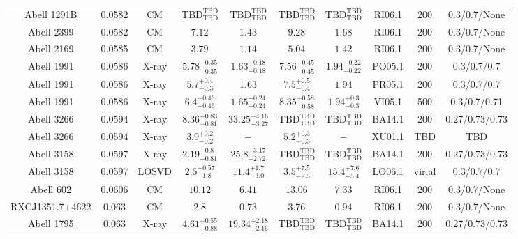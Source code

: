 \begin{table}
\begin{tabular}{cccccccccc}
Abell 1291B & 0.0582 & CM & ${\mathrm{TBD}}^{\mathrm{TBD}}_{\mathrm{TBD}}$ & ${\mathrm{TBD}}^{\mathrm{TBD}}_{\mathrm{TBD}}$ & ${\mathrm{TBD}}^{\mathrm{TBD}}_{\mathrm{TBD}}$ & ${\mathrm{TBD}}^{\mathrm{TBD}}_{\mathrm{TBD}}$ & RI06.1 & 200 & 0.3/0.7/None \\
Abell 2399 & 0.0582 & CM & ${7.12}^{}_{}$ & ${1.43}^{}_{}$ & ${9.28}^{}_{}$ & ${1.68}^{}_{}$ & RI06.1 & 200 & 0.3/0.7/None \\
Abell 2169 & 0.0585 & CM & ${3.79}^{}_{}$ & ${1.14}^{}_{}$ & ${5.04}^{}_{}$ & ${1.42}^{}_{}$ & RI06.1 & 200 & 0.3/0.7/None \\
Abell 1991 & 0.0586 & X-ray & ${5.78}^{+0.35}_{-0.35}$ & ${1.63}^{+0.18}_{-0.18}$ & ${7.56}^{+0.45}_{-0.45}$ & ${1.94}^{+0.22}_{-0.22}$ & PO05.1 & 200 & 0.3/0.7/0.7 \\
Abell 1991 & 0.0586 & X-ray & ${5.7}^{+0.4}_{-0.3}$ & ${1.63}^{}_{}$ & ${7.5}^{+0.5}_{-0.4}$ & ${1.94}^{}_{}$ & PR05.1 & 200 & 0.3/0.7/0.7 \\
Abell 1991 & 0.0586 & X-ray & ${6.4}^{+0.46}_{-0.46}$ & ${1.65}^{+0.24}_{-0.24}$ & ${8.35}^{+0.58}_{-0.58}$ & ${1.94}^{+0.3}_{-0.3}$ & VI05.1 & 500 & 0.3/0.7/0.71 \\
Abell 3266 & 0.0594 & X-ray & ${8.36}^{+0.83}_{-0.81}$ & ${33.25}^{+4.16}_{-3.27}$ & ${\mathrm{TBD}}^{\mathrm{TBD}}_{\mathrm{TBD}}$ & ${\mathrm{TBD}}^{\mathrm{TBD}}_{\mathrm{TBD}}$ & BA14.1 & 200 & 0.27/0.73/0.73 \\
Abell 3266 & 0.0594 & X-ray & ${3.9}^{+0.2}_{-0.2}$ & ${-}^{}_{}$ & ${5.2}^{+0.3}_{-0.3}$ & ${-}^{}_{}$ & XU01.1 & TBD & TBD \\
Abell 3158 & 0.0597 & X-ray & ${2.19}^{+0.8}_{-0.81}$ & ${25.8}^{+3.17}_{-2.72}$ & ${\mathrm{TBD}}^{\mathrm{TBD}}_{\mathrm{TBD}}$ & ${\mathrm{TBD}}^{\mathrm{TBD}}_{\mathrm{TBD}}$ & BA14.1 & 200 & 0.27/0.73/0.73 \\
Abell 3158 & 0.0597 & LOSVD & ${2.5}^{+0.57}_{-1.8}$ & ${11.4}^{+1.7}_{-3.0}$ & ${3.5}^{+7.5}_{-2.5}$ & ${15.4}^{+7.6}_{-5.4}$ & LO06.1 & virial & 0.3/0.7/0.7 \\
Abell 602 & 0.0606 & CM & ${10.12}^{}_{}$ & ${6.41}^{}_{}$ & ${13.06}^{}_{}$ & ${7.33}^{}_{}$ & RI06.1 & 200 & 0.3/0.7/None \\
RXCJ1351.7+4622 & 0.063 & CM & ${2.8}^{}_{}$ & ${0.73}^{}_{}$ & ${3.76}^{}_{}$ & ${0.94}^{}_{}$ & RI06.1 & 200 & 0.3/0.7/None \\
Abell 1795 & 0.063 & X-ray & ${4.61}^{+0.55}_{-0.88}$ & ${19.34}^{+2.18}_{-2.16}$ & ${\mathrm{TBD}}^{\mathrm{TBD}}_{\mathrm{TBD}}$ & ${\mathrm{TBD}}^{\mathrm{TBD}}_{\mathrm{TBD}}$ & BA14.1 & 200 & 0.27/0.73/0.73 \\

\end{tabular}
\end{table}
